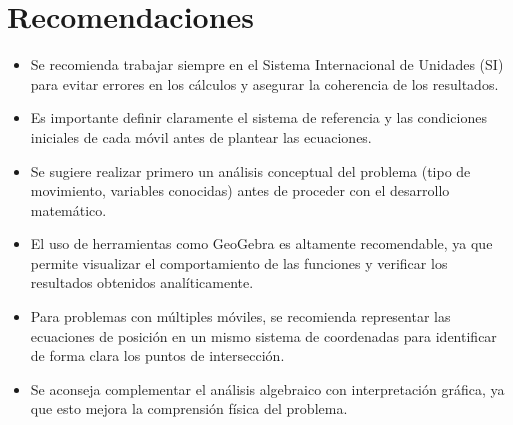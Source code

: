 \section{Recomendaciones}

\begin{itemize}
    \item Se recomienda trabajar siempre en el Sistema Internacional de Unidades (SI) para evitar errores en los cálculos y asegurar la coherencia de los resultados.
    
    \item Es importante definir claramente el sistema de referencia y las condiciones iniciales de cada móvil antes de plantear las ecuaciones.
    
    \item Se sugiere realizar primero un análisis conceptual del problema (tipo de movimiento, variables conocidas) antes de proceder con el desarrollo matemático.
    
    \item El uso de herramientas como GeoGebra es altamente recomendable, ya que permite visualizar el comportamiento de las funciones y verificar los resultados obtenidos analíticamente.
    
    \item Para problemas con múltiples móviles, se recomienda representar las ecuaciones de posición en un mismo sistema de coordenadas para identificar de forma clara los puntos de intersección.
    
    \item Se aconseja complementar el análisis algebraico con interpretación gráfica, ya que esto mejora la comprensión física del problema.
\end{itemize}